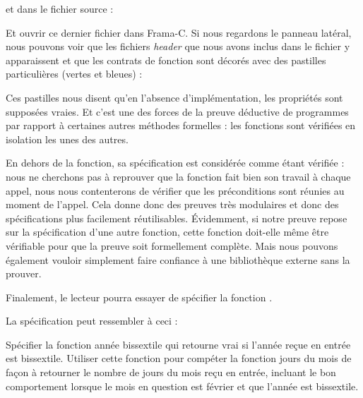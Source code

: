 


et dans le fichier source :






Et ouvrir ce dernier fichier dans Frama-C. Si nous regardons le panneau latéral,
nous pouvons voir que les fichiers \textit{header} que nous avons inclus dans le fichier
 y apparaissent et que les contrats de fonction sont décorés avec des
pastilles particulières (vertes et bleues) :





Ces pastilles nous disent qu'en l'absence d'implémentation, les propriétés sont
supposées vraies. Et c'est une des forces de la preuve déductive de programmes
par rapport à certaines autres méthodes formelles : les fonctions sont vérifiées
en isolation les unes des autres.



En dehors de la fonction, sa spécification est considérée comme étant
vérifiée : nous ne cherchons pas à reprouver que la fonction fait bien son travail
à chaque appel, nous nous contenterons de vérifier que les préconditions sont
réunies au moment de l'appel. Cela donne donc des preuves très modulaires et donc
des spécifications plus facilement réutilisables. Évidemment, si notre preuve
repose sur la spécification d'une autre fonction, cette fonction doit-elle même
être vérifiable pour que la preuve soit formellement complète. Mais nous pouvons
également vouloir simplement faire confiance à une bibliothèque externe sans la
prouver.



Finalement, le lecteur pourra essayer de spécifier la fonction .



La spécification peut ressembler à ceci :









\label{l4:contract-modularity-ex-days-of-month}


Spécifier la fonction année bissextile qui retourne vrai si l'année reçue
en entrée est bissextile. Utiliser cette fonction pour compéter la fonction
jours du mois de façon à retourner le nombre de jours du mois reçu en entrée,
incluant le bon comportement lorsque le mois en question est février et que
l'année est bissextile.


